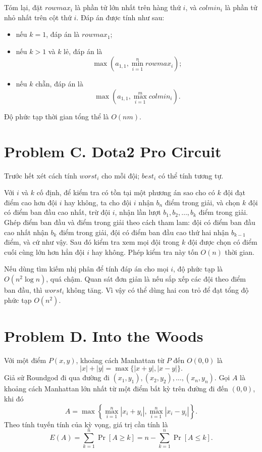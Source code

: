 \documentclass[11pt]{article}
\begin{document}
Tóm lại, đặt $\mathit{rowmax}_i$ là phần tử lớn nhất trên hàng thứ $i$, và
$\mathit{colmin}_i$ là phần tử nhỏ nhất trên cột thứ $i$. Đáp án được tính
như sau:
\begin{itemize}
  \item nếu $k=1$, đáp án là $\mathit{rowmax}_1$;
  \item nếu $k>1$ và $k$ lẻ, đáp án là
  \[
    \max\left(a_{1,1}, \min_{i=1}^{n}\mathit{rowmax}_i\right);
  \]
  \item nếu $k$ chẵn, đáp án là
  \[
    \max\left(a_{1,1}, \max_{i=1}^{m}\mathit{colmin}_i\right).
  \]
\end{itemize}

Độ phức tạp thời gian tổng thể là $O(nm)$.

\section{Problem C. Dota2 Pro Circuit}

Trước hết xét cách tính $\mathit{worst}_i$ cho mỗi đội; $\mathit{best}_i$
có thể tính tương tự.

Với $i$ và $k$ cố định, để kiểm tra có tồn tại một phương án sao cho có $k$
đội đạt điểm cao hơn đội $i$ hay không, ta cho đội $i$ nhận $b_n$ điểm trong
giải, và chọn $k$ đội có điểm ban đầu cao nhất, trừ đội $i$, nhận lần lượt
$b_1,b_2,\ldots,b_k$ điểm trong giải. Ghép điểm ban đầu và điểm trong giải
theo cách tham lam: đội có điểm ban đầu cao nhất nhận $b_k$ điểm trong giải,
đội có điểm ban đầu cao thứ hai nhận $b_{k-1}$ điểm, và cứ như vậy. Sau đó
kiểm tra xem mọi đội trong $k$ đội được chọn có điểm cuối cùng lớn hơn hẳn
đội $i$ hay không. Phép kiểm tra này tốn $O(n)$ thời gian.

Nếu dùng tìm kiếm nhị phân để tính đáp án cho mọi $i$, độ phức tạp là
$O(n^2\log n)$, quá chậm. Quan sát đơn giản là nếu sắp xếp các đội theo điểm
ban đầu, thì $\mathit{worst}_i$ không tăng. Vì vậy có thể dùng hai con trỏ để
đạt tổng độ phức tạp $O(n^2)$.

\section{Problem D. Into the Woods}

Với một điểm $P(x,y)$, khoảng cách Manhattan từ $P$ đến $O(0,0)$ là
\[
  |x|+|y|=\max\{|x+y|, |x-y|\}.
\]
Giả sử Roundgod đi qua đường đi
$(x_1,y_1),(x_2,y_2),\ldots,(x_n,y_n)$. Gọi $A$ là khoảng cách Manhattan lớn
nhất từ một điểm bất kỳ trên đường đi đến $(0,0)$, khi đó
\[
  A=\max\left\{\max_{i=1}^{n}|x_i+y_i|,
               \max_{i=1}^{n}|x_i-y_i|\right\}.
\]
Theo tính tuyến tính của kỳ vọng, giá trị cần tính là
\[
  E(A)=\sum_{k=1}^{n}\Pr[A\ge k]
      =n-\sum_{k=1}^{n}\Pr[A\le k].
\]
\end{document}

